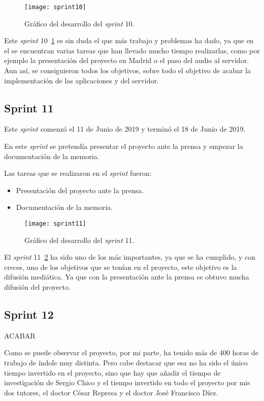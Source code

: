 \begin{figure}
	\centering
	\texttt{[image: sprint10]}
	\caption{Gráfico del desarrollo del \textit{sprint} 10.}
	\label{fig:sprint10}
\end{figure}

Este \textit{sprint} 10~\ref{fig:sprint10} es sin duda el que más trabajo y problemas ha dado, ya que en el se encuentran varias tareas que han llevado mucho tiempo realizarlas, como por ejemplo la presentación del proyecto en Madrid o el paso del audio al servidor. Aun así, se consiguieron todos los objetivos, sobre todo el objetivo de acabar la implementación de las aplicaciones y del servidor.

\subsection{Sprint 11}
Este \textit{sprint} comenzó el 11 de Junio de 2019 y terminó el 18 de Junio de 2019.

En este \textit{sprint} se pretendía presentar el proyecto ante la prensa y empezar la documentación de la memoria.

Las tareas que se realizaron en el \textit{sprint} fueron:
\begin{itemize}
	\item Presentación del proyecto ante la prensa.
	\item Documentación de la memoria.
\end{itemize}

\begin{figure}
	\centering
	\texttt{[image: sprint11]}
	\caption{Gráfico del desarrollo del \textit{sprint} 11.}
	\label{fig:sprint11}
\end{figure}

El \textit{sprint} 11~\ref{fig:sprint11} ha sido uno de los más importantes, ya que se ha cumplido, y con creces, uno de los objetivos que se tenían en el proyecto, este objetivo es la difusión mediática. Ya que con la presentación ante la prensa se obtuvo mucha difusión del proyecto.

\subsection{Sprint 12}
ACABAR

Como se puede observar el proyecto, por mi parte, ha tenido más de 400 horas de trabajo de índole muy distinta. Pero cabe destacar que esa no ha sido el único tiempo invertido en el proyecto, sino que hay que añadir el tiempo de investigación de Sergio Chico y el tiempo invertido en todo el proyecto por mis dos tutores, el doctor César Represa y el doctor José Francisco Díez.

